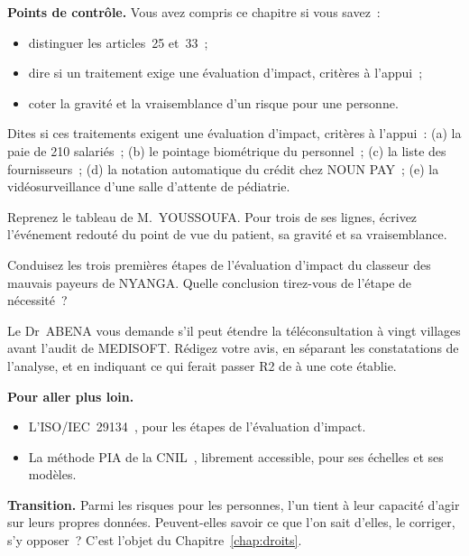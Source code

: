 \begin{boxinfo}
\textbf{Points de contrôle.} Vous avez compris ce chapitre si vous savez~:
\begin{itemize}
    \item distinguer les articles~25 et~33~;
    \item dire si un traitement exige une évaluation d'impact, critères à
          l'appui~;
    \item coter la gravité et la vraisemblance d'un risque pour une
          personne.
\end{itemize}
\end{boxinfo}

\begin{boxexo}[title={\ding{45}\quad Exercice~5.1. Évaluation d'impact ou non \niveaubase}]
Dites si ces traitements exigent une évaluation d'impact, critères à
l'appui~: (a) la paie de 210 salariés~; (b) le pointage biométrique du
personnel~; (c) la liste des fournisseurs~; (d) la notation automatique du
crédit chez NOUN PAY~; (e) la vidéosurveillance d'une salle d'attente de
pédiatrie.
\end{boxexo}

\begin{boxexo}[title={\ding{45}\quad Exercice~5.2. Réécrire le tableau \niveaumoyen}]
Reprenez le tableau de M.~YOUSSOUFA. Pour trois de ses lignes, écrivez
l'événement redouté du point de vue du patient, sa gravité et sa
vraisemblance.
\end{boxexo}

\begin{boxexo}[title={\ding{45}\quad Exercice~5.3. Le classeur des mauvais payeurs \niveaumoyen}]
Conduisez les trois premières étapes de l'évaluation d'impact du classeur
des mauvais payeurs de NYANGA. Quelle conclusion tirez-vous de l'étape de
nécessité~?
\end{boxexo}

\begin{boxexo}[title={\ding{45}\quad Exercice~5.4. Un risque inconnu \niveauexpert}]
Le Dr~ABENA vous demande s'il peut étendre la téléconsultation à vingt
villages avant l'audit de MEDISOFT. Rédigez votre avis, en séparant les
constatations de l'analyse, et en indiquant ce qui ferait passer R2 de
\NEK{} à une cote établie.
\end{boxexo}

\bigskip

\begin{boxinfo}
\textbf{Pour aller plus loin.}
\begin{itemize}
    \item L'ISO/IEC~29134~\cite{iso29134}, pour les étapes de l'évaluation
          d'impact.
    \item La méthode PIA de la CNIL~\cite{cnil2018pia}, librement
          accessible, pour ses échelles et ses modèles.
\end{itemize}
\end{boxinfo}

\begin{boxinfo}
\textbf{Transition.} Parmi les risques pour les personnes, l'un tient à leur
capacité d'agir sur leurs propres données. Peuvent-elles savoir ce que l'on
sait d'elles, le corriger, s'y opposer~? C'est l'objet du
Chapitre~\ref{chap:droits}.
\end{boxinfo}
